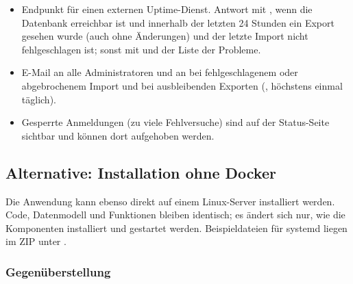 \begin{itemize}
  \item Endpunkt  für einen externen Uptime-Dienst. Antwort
         mit , wenn die Datenbank erreichbar
        ist und innerhalb der letzten 24 Stunden ein Export gesehen wurde
        (auch ohne Änderungen) und der letzte Import nicht fehlgeschlagen
        ist; sonst  mit  und der Liste der
        Probleme.
  \item E-Mail an alle Administratoren und an 
        bei fehlgeschlagenem oder abgebrochenem Import und bei ausbleibenden
        Exporten (, höchstens einmal täglich).
  \item Gesperrte Anmeldungen (zu viele Fehlversuche) sind auf der
        Status-Seite sichtbar und können dort aufgehoben werden.
\end{itemize}

\subsection{Alternative: Installation ohne Docker}\label{sec:nodocker}

Die Anwendung kann ebenso direkt auf einem Linux-Server installiert werden.
Code, Datenmodell und Funktionen bleiben identisch; es ändert sich nur, wie
die Komponenten installiert und gestartet werden. Beispieldateien für
systemd liegen im ZIP unter .

\subsubsection*{Gegenüberstellung}

